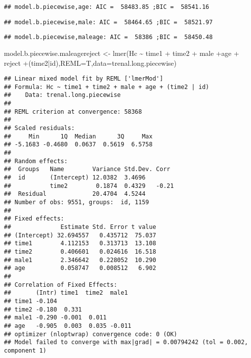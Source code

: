 \documentclass[
]{article}
\newenvironment{Shaded}{\begin{snugshade}}{\end{snugshade}}
\newcommand{\AttributeTok}[1]{\textcolor[rgb]{0.77,0.63,0.00}{#1}}
\newcommand{\FunctionTok}[1]{\textcolor[rgb]{0.00,0.00,0.00}{#1}}
\newcommand{\NormalTok}[1]{#1}
\newcommand{\OtherTok}[1]{\textcolor[rgb]{0.56,0.35,0.01}{#1}}
\newcommand{\SpecialCharTok}[1]{\textcolor[rgb]{0.00,0.00,0.00}{#1}}
\begin{document}
\begin{verbatim}
## model.b.piecewise,age: AIC =  58483.85 ;BIC =  58541.16
\end{verbatim}

\begin{verbatim}
## model.b.piecewise,male: AIC =  58464.65 ;BIC =  58521.97
\end{verbatim}

\begin{verbatim}
## model.b.piecewise,maleage: AIC =  58386 ;BIC =  58450.48
\end{verbatim}

\begin{Shaded}
\begin{Highlighting}[]
\NormalTok{model.b.piecewise.maleagereject }\OtherTok{\textless{}{-}} \FunctionTok{lmer}\NormalTok{(Hc }\SpecialCharTok{\textasciitilde{}}\NormalTok{ time1 }\SpecialCharTok{+}\NormalTok{ time2 }\SpecialCharTok{+}\NormalTok{ male }\SpecialCharTok{+}\NormalTok{age }\SpecialCharTok{+}\NormalTok{ reject }\SpecialCharTok{+}\NormalTok{(time2}\SpecialCharTok{|}\NormalTok{id),}\AttributeTok{REML=}\NormalTok{T,}\AttributeTok{data=}\NormalTok{trenal.long.piecewise)}
\end{Highlighting}
\end{Shaded}

\begin{verbatim}
## Linear mixed model fit by REML ['lmerMod']
## Formula: Hc ~ time1 + time2 + male + age + (time2 | id)
##    Data: trenal.long.piecewise
## 
## REML criterion at convergence: 58368
## 
## Scaled residuals: 
##     Min      1Q  Median      3Q     Max 
## -5.1683 -0.4680  0.0637  0.5619  6.5758 
## 
## Random effects:
##  Groups   Name        Variance Std.Dev. Corr 
##  id       (Intercept) 12.0382  3.4696        
##           time2        0.1874  0.4329   -0.21
##  Residual             20.4704  4.5244        
## Number of obs: 9551, groups:  id, 1159
## 
## Fixed effects:
##              Estimate Std. Error t value
## (Intercept) 32.694557   0.435712  75.037
## time1        4.112153   0.313713  13.108
## time2        0.406601   0.024616  16.518
## male1        2.346642   0.228052  10.290
## age          0.058747   0.008512   6.902
## 
## Correlation of Fixed Effects:
##       (Intr) time1  time2  male1 
## time1 -0.104                     
## time2 -0.180  0.331              
## male1 -0.290 -0.001  0.011       
## age   -0.905  0.003  0.035 -0.011
## optimizer (nloptwrap) convergence code: 0 (OK)
## Model failed to converge with max|grad| = 0.00794242 (tol = 0.002, component 1)
\end{verbatim}
\end{document}
